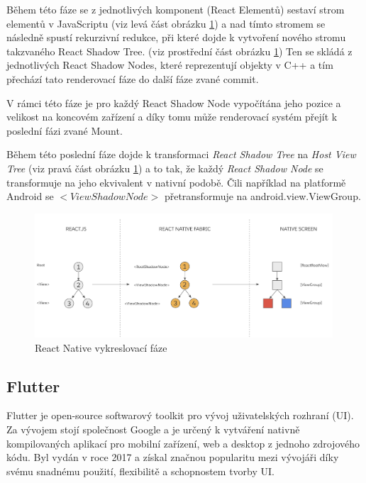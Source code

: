 
\smallskip

Během této fáze se z jednotlivých komponent (React Elementů) sestaví strom elementů v JavaScriptu (viz levá část obrázku \ref{fig:react-native-render-pipeline}) a nad tímto stromem se 
následně spustí rekurzivní redukce, při které dojde k vytvoření nového stromu takzvaného React Shadow Tree. (viz prostřední část obrázku \ref{fig:react-native-render-pipeline})
\cite{reactNativeRenderCommitMount} Ten se skládá z jednotlivých React Shadow Nodes, které reprezentují objekty v C++ a tím přechází tato renderovací fáze do další fáze zvané commit.\cite{reactNativeRenderCommitMount}

V rámci této fáze je pro každý React Shadow Node vypočítána jeho pozice a velikost na koncovém zařízení a díky tomu může renderovací systém
přejít k poslední fázi zvané Mount. \cite{reactNativeRenderCommitMount}

Během této poslední fáze dojde k transformaci \textit{React Shadow Tree} na \textit{Host View Tree} (viz pravá část obrázku \ref{fig:react-native-render-pipeline}) a to tak, že každý \textit{React Shadow Node}
se transformuje na jeho ekvivalent v nativní podobě. \cite{reactNativeRenderCommitMount} Čili například na platformě Android se $<ViewShadowNode>$ přetransformuje na android.view.ViewGroup. \cite{reactNativeRenderCommitMount}

\begin{figure}[H]
  \centering
  \includegraphics[width=0.99\textwidth]{react-native-render-pipeline.png}
  \caption{React Native vykreslovací fáze}
  \label{fig:react-native-render-pipeline}
\end{figure}

\subsection{Flutter}
Flutter je open-source softwarový toolkit pro vývoj uživatelských rozhraní (UI). \cite{flutterfaq} Za vývojem stojí společnost Google a je určený k vytváření nativně kompilovaných 
aplikací pro mobilní zařízení, web a desktop z jednoho zdrojového kódu. \cite{flutterfaq}
Byl vydán v roce 2017 a získal značnou popularitu mezi vývojáři díky svému snadnému použití, flexibilitě a schopnostem tvorby UI.

